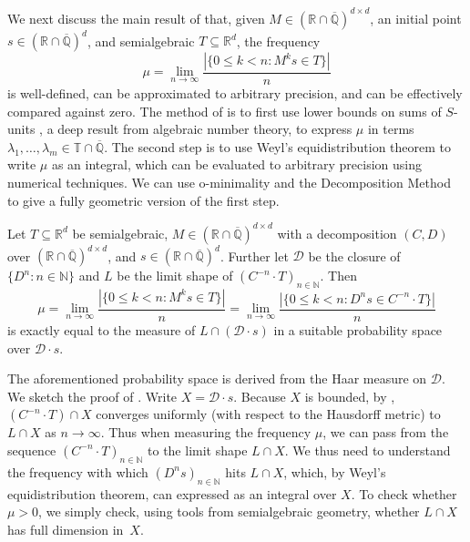 \documentclass[a4paper,UKenglish,cleveref]{lipics-v2021}
\newcommand{\torus}{\mathbb{T}}
\newcommand{\nat}{\mathbb{N}}
\newcommand{\rel}{\mathbb{R}}
\newcommand{\rat}{\mathbb{Q}}
\newcommand{\alg}{\overline{\rat}}
\newcommand{\ralg}{\rel \cap \alg}
\newcommand{\Dcal}{\mathcal{D}}
\newcommand{\seq}[1]{(#1)_{n \in \mathbb{N}}}
\begin{document}
We next discuss the main result of \cite{kelmendi2023computing} that, given $M \in (\ralg)^{d\times d}$, an initial point $s \in (\ralg)^d$, and semialgebraic  $T \subseteq \rel^d$, the frequency
\[
\mu = \lim_{n\to \infty} \frac{|\{0\le k < n \colon M^k s\in T\}|}{n}
\]
is well-defined, can be approximated to arbitrary precision, and can be effectively compared against zero.
The method of \cite{kelmendi2023computing} is to first use lower bounds on sums of $S$-units \cite{evertse1984sums}, a deep result from algebraic number theory, to express $\mu$ in terms $\lambda_1,\ldots,\lambda_m \in \torus \cap \alg$.
The second step is to use Weyl's equidistribution theorem to write $\mu$ as an integral, which can be evaluated to arbitrary precision using numerical techniques.
We can use o-minimality and the Decomposition Method to give a fully geometric version of the first step.
\begin{proposition}
	\label{thm:edon}
	Let $T \subseteq \rel^d$ be semialgebraic, $M \in (\ralg)^{d\times d}$ with a decomposition $(C,D)$ over $(\ralg)^{d\times d}$, and $s \in (\ralg)^d$.
	Further let $\Dcal$ be the closure of $\{D^n \colon n\in\nat\}$ and $L$ be the limit shape of $\seq{C^{-n} \cdot T}$.
	Then 
	\[
	\mu = \lim_{n\to \infty} \frac{|\{0 \le k < n \colon M^k s \in  T\}|}{n} =  \lim_{n\to \infty} \frac{|\{0 \le k < n \colon D^n s \in C^{-n} \cdot T\}|}{n}
	\]
	is exactly equal to the measure of $L \cap( \Dcal \cdot s)$ in a suitable probability space over $\Dcal \cdot s$.
\end{proposition}
The aforementioned probability space is derived from the Haar measure on $\Dcal$.
We sketch the proof of .
Write $X = \Dcal \cdot s$.
Because $X$ is bounded, by , $(C^{-n} \cdot T) \cap X$ converges uniformly (with respect to the Hausdorff metric) to $L \cap X$ as $n \to \infty$.
Thus when measuring the frequency $\mu$, we can pass from the sequence  $\seq{C^{-n} \cdot T}$ to the limit shape $L \cap X$.
We thus need to understand the frequency with which $(D^ns)_{n\in\nat}$ hits $L \cap X$, which, by Weyl's equidistribution theorem, can expressed as an integral over $X$.
To check whether $\mu > 0$, we simply check, using tools from semialgebraic geometry, whether $L \cap X$ has full dimension in~$X$.
\end{document}
